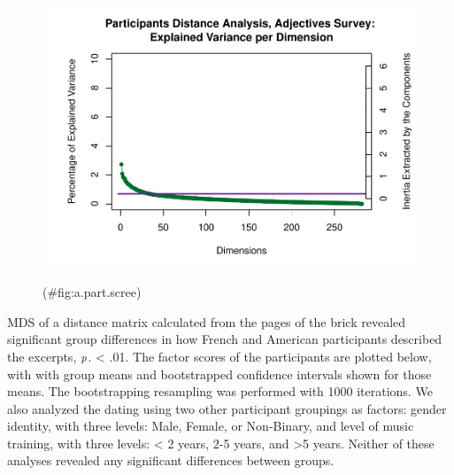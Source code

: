 \documentclass[
  english,
  man,floatsintext]{apa6}
\begin{document}
\begin{figure}

{\centering \includegraphics{Music-Descriptor-Space_files/figure-latex/a.part.scree-1} 

}

\caption{ }(\#fig:a.part.scree)
\end{figure}

MDS of a distance matrix calculated from the pages of the brick revealed significant group differences in how French and American participants described the excerpts, \(\textit p\). \textless{} .01. The factor scores of the participants are plotted below, with with group means and bootstrapped confidence intervals shown for those means. The bootstrapping resampling was performed with 1000 iterations. We also analyzed the dating using two other participant groupings as factors: gender identity, with three levels: Male, Female, or Non-Binary, and level of music training, with three levels: \textless{} 2 years, 2-5 years, and \textgreater5 years. Neither of these analyses revealed any significant differences between groups.
\end{document}
